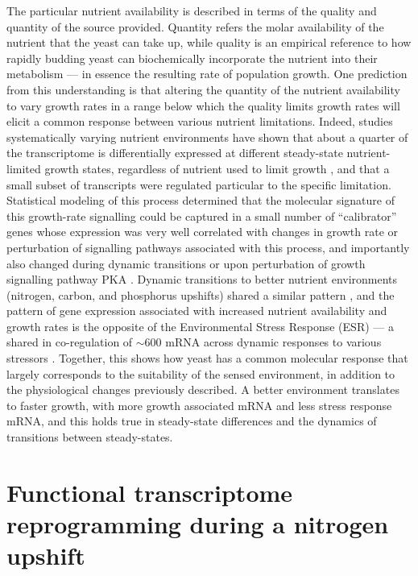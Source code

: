 The particular nutrient availability is described in terms of the 
quality and quantity of the source provided. Quantity refers 
the molar availability of the nutrient that the yeast can take up,
while quality is an empirical reference to how rapidly budding
yeast can biochemically incorporate the nutrient into their metabolism
--- in essence the resulting rate of population growth. 
One prediction from this understanding is that
altering the quantity of the nutrient availability to vary growth
rates in a range below which the quality limits growth rates will
elicit a common response between various nutrient limitations.
Indeed, studies systematically varying nutrient environments have
shown that about a quarter of the transcriptome is differentially
expressed at different steady-state nutrient-limited growth states,
regardless of nutrient used to limit growth 
\parencite{brauer2008coordination,regenberg2006growth}, and that a
small subset of transcripts were regulated particular to the specific
limitation. 
Statistical modeling of this process
determined that the molecular signature of this growth-rate signalling
could be captured in a small number of “calibrator” genes whose
expression was very well correlated with changes in growth rate or
perturbation of signalling pathways associated with this process, and
importantly also changed during dynamic transitions or upon
perturbation of growth signalling pathway PKA 
\parencite{airoldi2009predicting}.
Dynamic transitions to better nutrient environments (nitrogen, carbon,
and phosphorus upshifts) shared a similar pattern 
\parencite{conway2012glucose}, 
and the pattern of gene expression associated with increased
nutrient availability and growth rates is the opposite of the
Environmental Stress Response (ESR) --- a shared in co-regulation of
$\sim$600 mRNA across dynamic responses to various stressors 
\parencite{gasch2000genomic}. 
Together, this shows how yeast has a common molecular response that
largely corresponds to the suitability of the sensed environment,
in addition to the physiological changes previously described.
A better environment translates to faster growth, with
more growth associated mRNA and less stress response mRNA, and this
holds true in steady-state differences and the dynamics of 
transitions between steady-states.

\section{Functional transcriptome reprogramming during a
nitrogen upshift}

